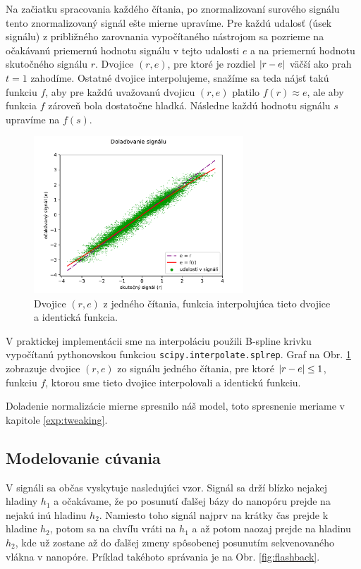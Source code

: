 Na začiatku spracovania každého čítania, po znormalizovaní surového signálu
 tento znormalizovaný signál ešte mierne upravíme.
Pre každú udalosť (úsek signálu) z približného zarovnania vypočítaného nástrojom \resquiggle{} sa
pozrieme na očakávanú priemernú hodnotu signálu v tejto udalosti $e$ a na priemernú hodnotu skutočného
signálu $r$. Dvojice $(r, e)$, pre ktoré je rozdiel $\abs*{r-e}$ väčší ako prah $t=1$ zahodíme.
Ostatné dvojice interpolujeme, snažíme sa teda nájsť takú funkciu $f$, aby pre každú uvažovanú
dvojicu $(r, e)$ platilo $f(r) \approx e$, ale aby funkcia $f$ zároveň bola dostatočne hladká.
Následne každú hodnotu signálu $s$ upravíme na $f(s)$.

\begin{figure}
\centerline{\includegraphics[width=0.7\textwidth]{plots/signal_tweaking}}
\caption{Dvojice $(r, e)$ z jedného čítania, funkcia interpolujúca tieto dvojice a identická funkcia.}
\label{fig:signal_tweaking}
\end{figure}

V praktickej implementácii sme na interpoláciu použili B-spline krivku vypočítanú pythonovskou
funkciou \texttt{scipy.interpolate.splrep}. Graf na Obr. \ref{fig:signal_tweaking} zobrazuje dvojice $(r, e)$
zo signálu jedného čítania, pre ktoré $\abs*{r - e} \leq 1$, funkciu $f$, ktorou sme tieto dvojice interpolovali a identickú funkciu.

Doladenie normalizácie mierne spresnilo náš model, toto spresnenie meriame v kapitole \ref{exp:tweaking}.

\subsection{Modelovanie cúvania}
\label{upg:flashbacks}

V signáli sa občas vyskytuje nasledujúci vzor. Signál sa drží blízko nejakej hladiny $h_1$ a očakávame, 
že po posunutí ďalšej bázy do nanopóru prejde na nejakú inú hladinu $h_2$. Namiesto toho signál 
najprv na krátky čas prejde k hladine $h_2$, potom sa na chvíľu vráti na $h_1$ a až potom naozaj prejde
na hladinu $h_2$, kde už zostane až do ďalšej zmeny spôsobenej posunutím sekvenovaného vlákna v nanopóre.
Príklad takéhoto správania je na Obr. \ref{fig:flashback}.

